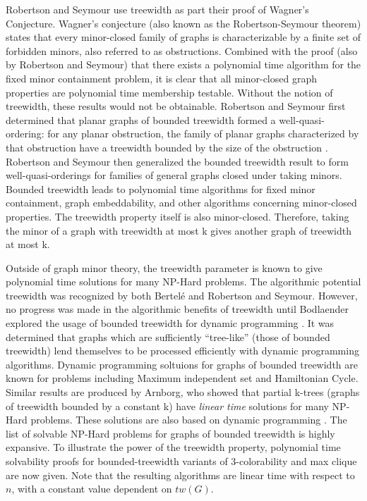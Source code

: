 \documentclass[12pt,conference]{IEEEtran}
\theoremstyle{plain}
\begin{document}
Robertson and Seymour use treewidth as part their proof of Wagner's Conjecture. Wagner's conjecture (also known as the Robertson-Seymour theorem) states that every minor-closed family of graphs is characterizable by a finite set of forbidden minors, also referred to as obstructions. Combined with the proof (also by Robertson and Seymour) that there exists a polynomial time algorithm for the fixed minor containment problem, it is clear that all minor-closed graph properties are polynomial time membership testable. Without the notion of treewidth, these results would not be obtainable. Robertson and Seymour first determined that planar graphs of bounded treewidth formed a well-quasi-ordering: for any planar obstruction, the family of planar graphs characterized by that obstruction have a treewidth bounded by the size of the obstruction \cite{seymour-stack-overflow}. Robertson and Seymour then generalized the bounded treewidth result to form well-quasi-orderings for families of general graphs closed under taking minors. Bounded treewidth leads to polynomial time algorithms for fixed minor containment, graph embeddability, and other algorithms concerning minor-closed properties. The treewidth property itself is also minor-closed. Therefore, taking the minor of a graph with treewidth at most k gives another graph of treewidth at most k. 

Outside of graph minor theory, the treewidth parameter is known to give polynomial time solutions for many NP-Hard problems. The algorithmic potential treewidth was recognized by both Bertel\'e and Robertson and Seymour. However, no progress was made in the algorithmic benefits of treewidth until Bodlaender explored the usage of bounded treewidth for dynamic programming \cite{treewidth-dynamic-programming-1988}. It was determined that graphs which are sufficiently ``tree-like'' (those of bounded treewidth) lend themselves to be processed efficiently with dynamic programming algorithms. Dynamic programming soltuions for graphs of bounded treewidth are known for problems including Maximum independent set and Hamiltonian Cycle. Similar results are produced by Arnborg, who showed that partial k-trees (graphs of treewidth bounded by a constant k) have \textit{linear time} solutions for many NP-Hard problems. These solutions are also based on dynamic programming \cite{arnborg-linear-treewidth-algs}. The list of solvable NP-Hard problems for graphs of bounded treewidth is highly expansive. To illustrate the power of the treewidth property, polynomial time solvability proofs for bounded-treewidth variants of 3-colorability and max clique are now given. Note that the resulting algorithms are linear time with respect to $n$, with a constant value dependent on $tw(G)$.
\end{document}
